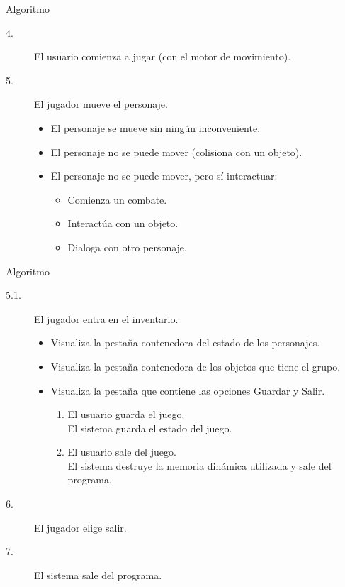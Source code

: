 \documentclass[9pt,xcolor=svgnames]{beamer}
\begin{document}
  \begin{frame}{Algoritmo}

   \begin{description}
    \item[4.] El usuario comienza a jugar (con el motor de movimiento).
    \item[5.] El jugador mueve el personaje.
	  
	  \begin{itemize}
	   \item El personaje se mueve sin ningún inconveniente.
	   \item El personaje no se puede mover (colisiona con un objeto).
	   \item El personaje no se puede mover, pero sí interactuar:	 
		 \begin{itemize}
		  \item Comienza un combate.		  
		  \item Interactúa con un objeto.
		  \item Dialoga con otro personaje.			
		 \end{itemize}
		 
	  \end{itemize}
   \end{description}

  \end{frame}
  
  
  \begin{frame}{Algoritmo}

   \begin{description}
    \item[5.1.] El jugador entra en el inventario.
	  
	  \begin{itemize}
	   \item Visualiza la pestaña contenedora del estado de los
		 personajes.
	   \item Visualiza la pestaña contenedora de los objetos que tiene el
		  grupo.
	   \item Visualiza la pestaña que contiene las opciones Guardar y
		 Salir.
	  
		 \begin{enumerate}
		  \item El usuario guarda el juego.\\
			El sistema guarda el estado del juego.
		  \item El usuario sale del juego.\\
			El sistema destruye la memoria dinámica
			utilizada y sale del programa.		  
		 \end{enumerate}
	  \end{itemize}
	  
    \item[6.] El jugador elige salir.
    \item[7.] El sistema sale del programa.	  
   \end{description}
  \end{frame}
    
\end{document}
